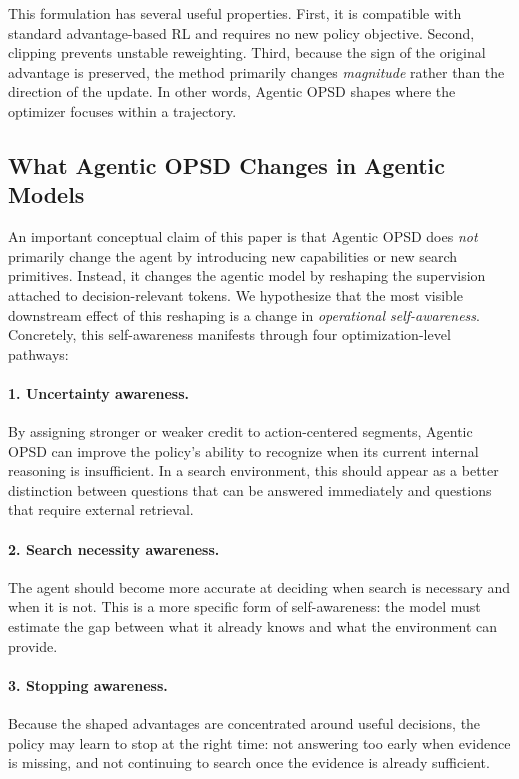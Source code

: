 \documentclass[11pt]{article}
\newcommand{\method}{Agentic OPSD}
\begin{document}
This formulation has several useful properties. First, it is compatible with standard advantage-based RL and requires no new policy objective. Second, clipping prevents unstable reweighting. Third, because the sign of the original advantage is preserved, the method primarily changes \emph{magnitude} rather than the direction of the update. In other words, \method{} shapes where the optimizer focuses within a trajectory.

\subsection{What \method{} Changes in Agentic Models}
An important conceptual claim of this paper is that \method{} does \emph{not} primarily change the agent by introducing new capabilities or new search primitives. Instead, it changes the agentic model by reshaping the supervision attached to decision-relevant tokens. We hypothesize that the most visible downstream effect of this reshaping is a change in \emph{operational self-awareness}. Concretely, this self-awareness manifests through four optimization-level pathways:

\paragraph{1. Uncertainty awareness.}
By assigning stronger or weaker credit to action-centered segments, \method{} can improve the policy's ability to recognize when its current internal reasoning is insufficient. In a search environment, this should appear as a better distinction between questions that can be answered immediately and questions that require external retrieval.

\paragraph{2. Search necessity awareness.}
The agent should become more accurate at deciding when search is necessary and when it is not. This is a more specific form of self-awareness: the model must estimate the gap between what it already knows and what the environment can provide.

\paragraph{3. Stopping awareness.}
Because the shaped advantages are concentrated around useful decisions, the policy may learn to stop at the right time: not answering too early when evidence is missing, and not continuing to search once the evidence is already sufficient.
\end{document}
